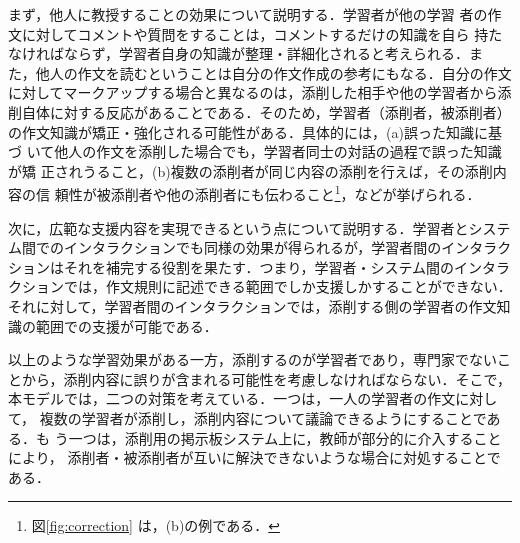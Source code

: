 \documentclass[japanese]{jnlp_1.4}
\def\modl{}
\def\moda{}
\begin{document}
まず，他人に教授することの効果について{\moda 説明する．}学習者が他の学習
者の作文に対してコメントや質問をすることは，コメントするだけの知識を自ら
持たなければならず，学習者自身の知識が整理・詳細化されると考えられる．ま
た，他人の作文を読むということは自分の作文作成の参考にもなる．自分の作文
に対してマークアップする場合と異なるのは，添削した相手や他の学習者から添
削自体に対する反応があることである．そのため，学習者（添削者，被添削者）
の作文知識が矯正・強化される可能性がある．{\modl 具体的には，(a)誤った知識に基づ
いて他人の作文を添削した場合でも，学習者同士の対話の過程で誤った知識が矯
正されうること，(b)複数の添削者が同じ内容の添削を行えば，その添削内容の信
頼性が被添削者や他の添削者にも伝わること\footnote{図\ref{fig:correction}
は，(b)の例である．}，などが挙げられる．}

次に，広範な支援内容を実現できるという点について説明する．学習者とシステ
ム間でのインタラクションでも同様の効果が得られるが，学習者間のインタラク
ションはそれを補完する役割を果たす．つまり，学習者・システム間のインタラ
クションでは，作文規則に記述できる範囲でしか支援しかすることができない．
それに対して，学習者間のインタラクションでは，添削する側の学習者の作文知
識の範囲での支援が可能である．

以上のような学習効果がある一方，添削するのが学習者であり，専門家でないこ
とから，添削内容に誤りが含まれる可能性を考慮しなければならない．そこで，
本モデルでは，二つの対策を考えている．一つは，一人の学習者の作文に対して，
複数の学習者が添削し，添削内容について議論できるようにすることである．も
う一つは，添削用の掲示板システム上に，教師が部分的に介入することにより，
添削者・被添削者が互いに解決できないような場合に対処することである．
\end{document}
